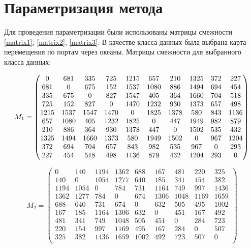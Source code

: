 \section{Параметризация метода}

Для проведения параметризации были использованы матрицы смежности \eqref{matrix1}, \eqref{matrix2}, \eqref{matrix3}. 
В качестве класса данных была выбрана карта перемещения по портам через океаны.
Матрицы смежности для выбранного класса данных:

\begin{equation}
	\hspace*{-0.5mm}\label{matrix1}
	M_1 = \begin{pmatrix}
		0	&681	&335	&725	&1215	&657	&210	&1325	&372	&227\\
		681	&0	&675	&152	&1537	&1080	&886	&1494	&694	&454\\
		335	&675	&0	&827	&1547	&405	&364	&1660	&704	&518\\
		725	&152	&827	&0	&1470	&1232	&930	&1373	&657	&498\\
		1215	&1537	&1547	&1470	&0	&1825	&1378	&580	&843	&1136\\
		657	&1080	&405	&1232	&1825	&0	&447	&1949	&982	&879\\
		210	&886	&364	&930	&1378	&447	&0	&1502	&535	&432\\
		1325	&1494	&1660	&1373	&580	&1949	&1502	&0	&967	&1204\\
		372	&694	&704	&657	&843	&982	&535	&967	&0	&293\\
		227	&454	&518	&498	&1136	&879	&432	&1204	&293	&0\\
	\end{pmatrix}
\end{equation}

\begin{equation}
	\label{matrix2}
	M_2 = \begin{pmatrix}
0	&140	&1194	&1362	&688	&167	&481	&220	&325\\
140	&0	&1054	&1277	&640	&185	&341	&154	&382\\
1194	&1054	&0	&784	&731	&1164	&749	&997	&1436\\
1362	&1277	&784	&0	&674	&1306	&1048	&1169	&1659\\
688	&640	&731	&674	&0	&632	&505	&495	&1002\\
167	&185	&1164	&1306	&632	&0	&451	&167	&492\\
481	&341	&749	&1048	&505	&451	&0	&284	&723\\
220	&154	&997	&1169	&495	&167	&284	&0	&507\\
325	&382	&1436	&1659	&1002	&492	&723	&507	&0\\
	\end{pmatrix}
\end{equation}


